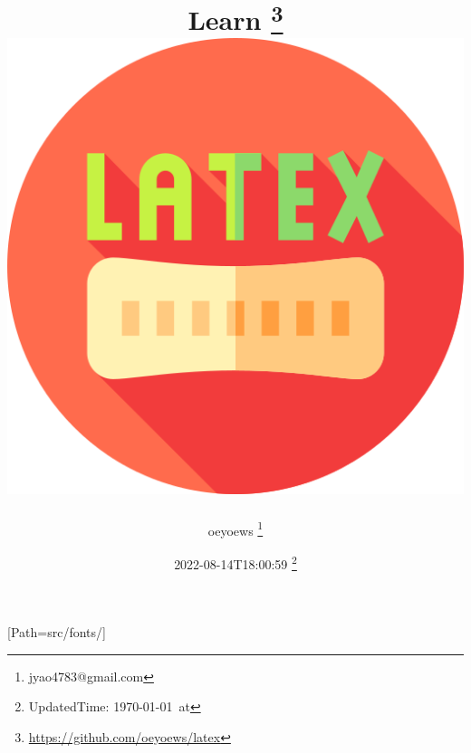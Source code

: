\usepackage{
	emoji,
	docmute,
	amsmath,
	graphicx,
	float,
	hyperref,
	datetime,
	import,
	pdfpages,
	xcolor,
	transparent,
}

\newcommand{\incfig}[2][1]{%
	\def\svgwidth{#1\columnwidth}
	{#2.pdf_tex}
}

\newcommand{\inctex}[1]{
	
}

\title{
{ Learn \LaTeXe{}}
	{\thanks{\url{https://github.com/oeyoews/latex}}} \\
{\includegraphics[scale=0.2]{latex}}
}
\author{ oeyoews \thanks{jyao4783@gmail.com}}
\date{ 2022-08-14T18:00:59 \thanks{UpdatedTime: \today\ at \currenttime}}

[Path={src/fonts/}] %
\setcounter{tocdepth}{1} %
\graphicspath{{src/img/}} %
\hypersetup{colorlinks=true,} %
